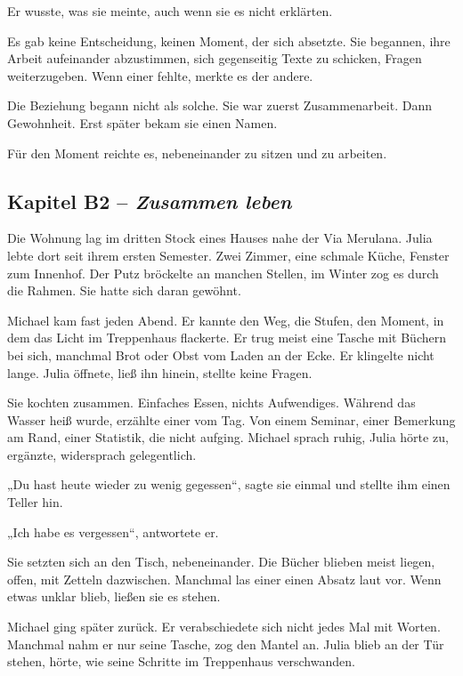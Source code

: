 \documentclass[
]{article}
\begin{document}
Er wusste, was sie meinte, auch wenn sie es nicht erklärten.

Es gab keine Entscheidung, keinen Moment, der sich absetzte. Sie begannen, ihre Arbeit aufeinander abzustimmen, sich gegenseitig Texte zu schicken, Fragen weiterzugeben. Wenn einer fehlte, merkte es der andere.

Die Beziehung begann nicht als solche. Sie war zuerst Zusammenarbeit. Dann Gewohnheit. Erst später bekam sie einen Namen.

Für den Moment reichte es, nebeneinander zu sitzen und zu arbeiten.

\subsection{\texorpdfstring{Kapitel B2 -- \emph{Zusammen leben}}{Kapitel B2 -- Zusammen leben}}\label{kapitel-b2-zusammen-leben}

Die Wohnung lag im dritten Stock eines Hauses nahe der Via Merulana. Julia lebte dort seit ihrem ersten Semester. Zwei Zimmer, eine schmale Küche, Fenster zum Innenhof. Der Putz bröckelte an manchen Stellen, im Winter zog es durch die Rahmen. Sie hatte sich daran gewöhnt.

Michael kam fast jeden Abend. Er kannte den Weg, die Stufen, den Moment, in dem das Licht im Treppenhaus flackerte. Er trug meist eine Tasche mit Büchern bei sich, manchmal Brot oder Obst vom Laden an der Ecke. Er klingelte nicht lange. Julia öffnete, ließ ihn hinein, stellte keine Fragen.

Sie kochten zusammen. Einfaches Essen, nichts Aufwendiges. Während das Wasser heiß wurde, erzählte einer vom Tag. Von einem Seminar, einer Bemerkung am Rand, einer Statistik, die nicht aufging. Michael sprach ruhig, Julia hörte zu, ergänzte, widersprach gelegentlich.

„Du hast heute wieder zu wenig gegessen``, sagte sie einmal und stellte ihm einen Teller hin.

„Ich habe es vergessen``, antwortete er.

Sie setzten sich an den Tisch, nebeneinander. Die Bücher blieben meist liegen, offen, mit Zetteln dazwischen. Manchmal las einer einen Absatz laut vor. Wenn etwas unklar blieb, ließen sie es stehen.

Michael ging später zurück. Er verabschiedete sich nicht jedes Mal mit Worten. Manchmal nahm er nur seine Tasche, zog den Mantel an. Julia blieb an der Tür stehen, hörte, wie seine Schritte im Treppenhaus verschwanden.
\end{document}
